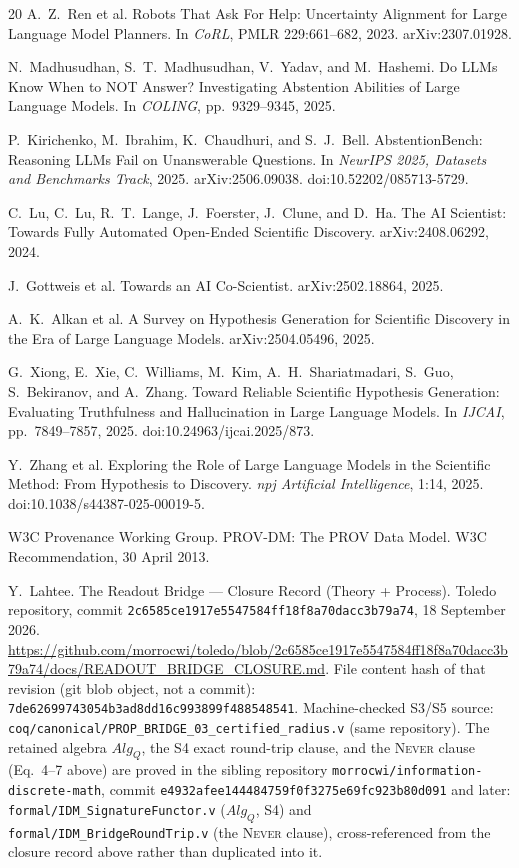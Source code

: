\documentclass[10pt,twocolumn]{article}
\begin{document}
\begin{sloppypar}
\begin{thebibliography}{20}
 A.~Z.~Ren et al. Robots That Ask For Help: Uncertainty Alignment for Large Language Model Planners. In \emph{CoRL}, PMLR 229:661--682, 2023. arXiv:2307.01928.

 N.~Madhusudhan, S.~T.~Madhusudhan, V.~Yadav, and M.~Hashemi. Do LLMs Know When to NOT Answer? Investigating Abstention Abilities of Large Language Models. In \emph{COLING}, pp.\ 9329--9345, 2025.

 P.~Kirichenko, M.~Ibrahim, K.~Chaudhuri, and S.~J.~Bell. AbstentionBench: Reasoning LLMs Fail on Unanswerable Questions. In \emph{NeurIPS 2025, Datasets and Benchmarks Track}, 2025. arXiv:2506.09038. doi:10.52202/085713-5729.

 C.~Lu, C.~Lu, R.~T.~Lange, J.~Foerster, J.~Clune, and D.~Ha. The AI Scientist: Towards Fully Automated Open-Ended Scientific Discovery. arXiv:2408.06292, 2024.

 J.~Gottweis et al. Towards an AI Co-Scientist. arXiv:2502.18864, 2025.

 A.~K.~Alkan et al. A Survey on Hypothesis Generation for Scientific Discovery in the Era of Large Language Models. arXiv:2504.05496, 2025.

 G.~Xiong, E.~Xie, C.~Williams, M.~Kim, A.~H.~Shariatmadari, S.~Guo, S.~Bekiranov, and A.~Zhang. Toward Reliable Scientific Hypothesis Generation: Evaluating Truthfulness and Hallucination in Large Language Models. In \emph{IJCAI}, pp.\ 7849--7857, 2025. doi:10.24963/ijcai.2025/873.

 Y.~Zhang et al. Exploring the Role of Large Language Models in the Scientific Method: From Hypothesis to Discovery. \emph{npj Artificial Intelligence}, 1:14, 2025. doi:10.1038/s44387-025-00019-5.

 W3C Provenance Working Group. PROV-DM: The PROV Data Model. W3C Recommendation, 30 April 2013.

 Y.~Lahtee. The Readout Bridge --- Closure Record (Theory + Process). Toledo repository, commit \texttt{2c6585ce1917e5547584ff18f8a70dacc3b79a74}, 18 September 2026. \url{https://github.com/morrocwi/toledo/blob/2c6585ce1917e5547584ff18f8a70dacc3b79a74/docs/READOUT_BRIDGE_CLOSURE.md}. File content hash of that revision (git blob object, not a commit): \texttt{7de62699743054b3ad8dd16c993899f488548541}. Machine-checked S3/S5 source: \texttt{coq/canonical/PROP\_BRIDGE\_03\_certified\_radius.v} (same repository). The retained algebra $Alg_Q$, the S4 exact round-trip clause, and the \textsc{Never} clause (Eq.~4--7 above) are proved in the sibling repository \texttt{morrocwi/information-discrete-math}, commit \texttt{e4932afee144484759f0f3275e69fc923b80d091} and later: \texttt{formal/IDM\_SignatureFunctor.v} ($Alg_Q$, S4) and \texttt{formal/IDM\_BridgeRoundTrip.v} (the \textsc{Never} clause), cross-referenced from the closure record above rather than duplicated into it.


\end{thebibliography}
\end{sloppypar}
\end{document}
